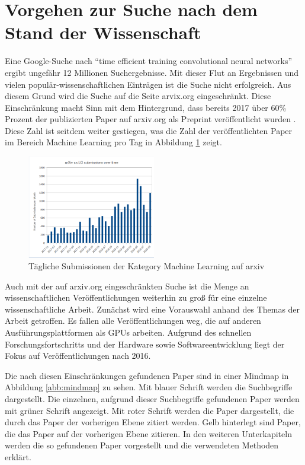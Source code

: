 \color{black}
\section{Vorgehen zur Suche nach dem Stand der Wissenschaft}\label{sec:suche}
Eine Google-Suche nach ``time efficient training convolutional neural networks'' ergibt ungefähr 12 Millionen Suchergebnisse. Mit dieser Flut an Ergebnissen und vielen populär-wissenschaftlichen Einträgen ist die Suche nicht erfolgreich. Aus diesem Grund wird die Suche auf die Seite arvix.org eingeschränkt. Diese Einschränkung macht Sinn mit dem Hintergrund, dass bereits 2017 über 60\% Prozent der publizierten Paper auf arxiv.org als Preprint veröffentlicht wurden \cite{popular}. Diese Zahl ist seitdem weiter gestiegen, was die Zahl der veröffentlichten Paper im Bereich Machine Learning pro Tag in Abbildung \ref{abb:arxiv} zeigt.

\begin{figure}[h]
 \centering
 \includegraphics[width=0.5\textwidth]{KapitelPartA/images/arxiv.png}
 \caption{Tägliche Submissionen der Kategory Machine Learning auf arxiv \cite{cornell}}
 \label{abb:arxiv}
\end{figure}


Auch mit der auf arxiv.org eingeschränkten Suche ist die Menge an wissenschaftlichen Veröffentlichungen weiterhin zu groß für eine einzelne wissenschaftliche Arbeit. Zunächst wird eine Vorauswahl anhand des Themas der Arbeit getroffen. Es fallen alle Veröffentlichungen weg, die auf anderen Ausführungsplattformen als GPUs arbeiten. Aufgrund des schnellen Forschungsfortschritts und der Hardware sowie Softwareentwicklung liegt der Fokus auf Veröffentlichungen nach 2016.

Die nach diesen Einschränkungen gefundenen Paper sind in einer Mindmap in Abbildung \ref{abb:mindmap} zu sehen. Mit blauer Schrift werden die Suchbegriffe dargestellt. Die einzelnen, aufgrund dieser Suchbegriffe gefundenen Paper werden mit grüner Schrift angezeigt. Mit roter Schrift werden die Paper dargestellt, die durch das Paper der vorherigen Ebene zitiert werden. Gelb hinterlegt sind Paper, die das Paper auf der vorherigen Ebene zitieren. In den weiteren Unterkapiteln werden die so gefundenen Paper vorgestellt und die verwendeten Methoden erklärt. 

